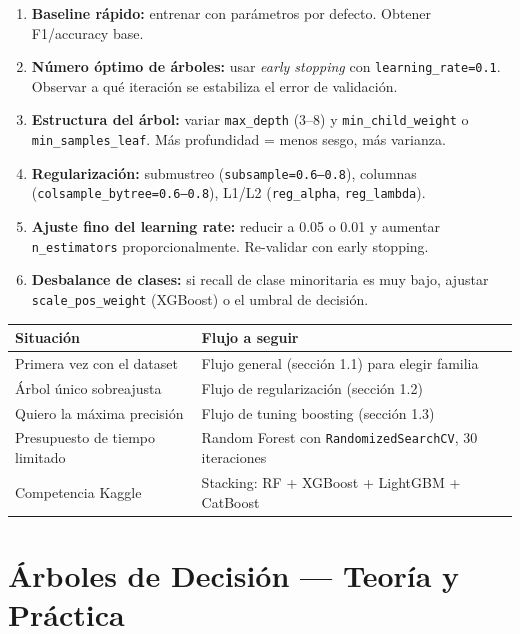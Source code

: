 \documentclass[11pt, a4paper]{book}
\begin{document}
\begin{enumerate}[leftmargin=*, label=\textbf{Paso \arabic*.}]
  \item \textbf{Baseline rápido:} entrenar con parámetros por defecto. Obtener F1/accuracy base.
  \item \textbf{Número óptimo de árboles:} usar \textit{early stopping} con \texttt{learning\_rate=0.1}.
        Observar a qué iteración se estabiliza el error de validación.
  \item \textbf{Estructura del árbol:} variar \texttt{max\_depth} (3--8) y \texttt{min\_child\_weight}
        o \texttt{min\_samples\_leaf}. Más profundidad = menos sesgo, más varianza.
  \item \textbf{Regularización:} submustreo (\texttt{subsample=0.6--0.8}),
        columnas (\texttt{colsample\_bytree=0.6--0.8}),
        L1/L2 (\texttt{reg\_alpha}, \texttt{reg\_lambda}).
  \item \textbf{Ajuste fino del learning rate:} reducir a 0.05 o 0.01 y aumentar \texttt{n\_estimators}
        proporcionalmente. Re-validar con early stopping.
  \item \textbf{Desbalance de clases:} si recall de clase minoritaria es muy bajo, ajustar
        \texttt{scale\_pos\_weight} (XGBoost) o el umbral de decisión.
\end{enumerate}

\begin{cuando}
  \begin{tabular}{lp{9cm}}
    \toprule
    \textbf{Situación} & \textbf{Flujo a seguir}\\
    \midrule
    Primera vez con el dataset & Flujo general (sección 1.1) para elegir familia\\
    Árbol único sobreajusta & Flujo de regularización (sección 1.2)\\
    Quiero la máxima precisión & Flujo de tuning boosting (sección 1.3)\\
    Presupuesto de tiempo limitado & Random Forest con \texttt{RandomizedSearchCV}, 30 iteraciones\\
    Competencia Kaggle & Stacking: RF + XGBoost + LightGBM + CatBoost\\
    \bottomrule
  \end{tabular}
\end{cuando}

\chapter{Árboles de Decisión — Teoría y Práctica}
\end{document}
